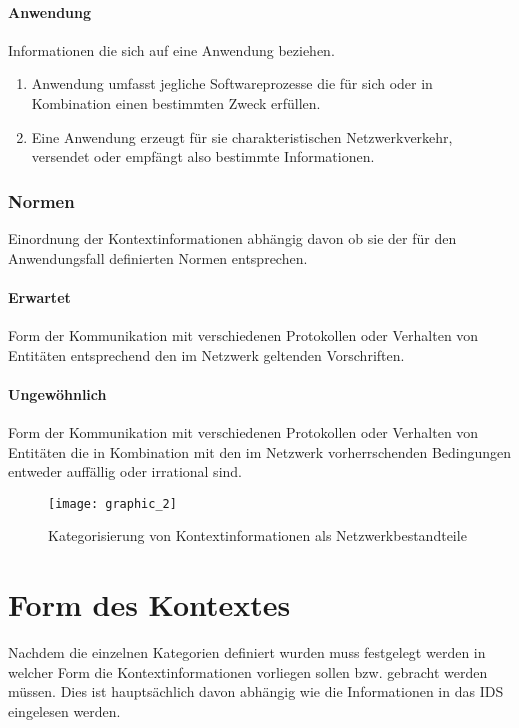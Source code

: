 \paragraph{Anwendung}
Informationen die sich auf eine Anwendung beziehen.
\begin{enumerate}
\item{Anwendung umfasst jegliche Softwareprozesse die für sich oder in Kombination einen bestimmten Zweck erfüllen.}
\item{Eine Anwendung erzeugt für sie charakteristischen Netzwerkverkehr, versendet oder empfängt also bestimmte Informationen.}
\end{enumerate}
\subsubsection{Normen}
Einordnung der Kontextinformationen abhängig davon ob sie der für den Anwendungsfall definierten Normen entsprechen.
\paragraph{Erwartet}
Form der Kommunikation mit verschiedenen Protokollen oder Verhalten von Entitäten entsprechend den im Netzwerk geltenden Vorschriften.
\paragraph{Ungewöhnlich}
Form der Kommunikation mit verschiedenen Protokollen oder Verhalten von Entitäten die in Kombination mit den im Netzwerk vorherrschenden Bedingungen entweder auffällig oder irrational sind.
\newpage
\begin{figure}[H]
\centering
\texttt{[image: graphic\_2]}
\caption{Kategorisierung von Kontextinformationen als Netzwerkbestandteile}
\end{figure}
\newpage

\section{Form des Kontextes}
Nachdem die einzelnen Kategorien definiert wurden muss festgelegt werden in welcher Form die Kontextinformationen vorliegen sollen bzw. gebracht werden müssen. Dies ist hauptsächlich davon abhängig wie die Informationen in das IDS eingelesen werden.



